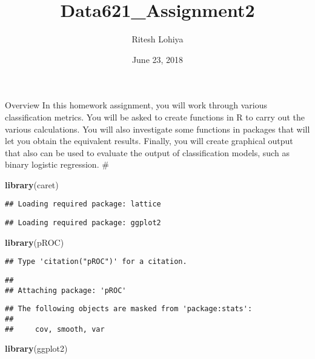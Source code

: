 \documentclass[]{article}
\title{Data621\_Assignment2}
\author{Ritesh Lohiya}
\date{June 23, 2018}
\newenvironment{Shaded}{\begin{snugshade}}{\end{snugshade}}
\newcommand{\KeywordTok}[1]{\textcolor[rgb]{0.13,0.29,0.53}{\textbf{#1}}}
\newcommand{\NormalTok}[1]{#1}
\begin{document}
\maketitle

Overview In this homework assignment, you will work through various
classification metrics. You will be asked to create functions in R to
carry out the various calculations. You will also investigate some
functions in packages that will let you obtain the equivalent results.
Finally, you will create graphical output that also can be used to
evaluate the output of classification models, such as binary logistic
regression. \#

\begin{Shaded}
\begin{Highlighting}[]
\KeywordTok{library}\NormalTok{(caret)}
\end{Highlighting}
\end{Shaded}

\begin{verbatim}
## Loading required package: lattice
\end{verbatim}

\begin{verbatim}
## Loading required package: ggplot2
\end{verbatim}

\begin{Shaded}
\begin{Highlighting}[]
\KeywordTok{library}\NormalTok{(pROC)}
\end{Highlighting}
\end{Shaded}

\begin{verbatim}
## Type 'citation("pROC")' for a citation.
\end{verbatim}

\begin{verbatim}
## 
## Attaching package: 'pROC'
\end{verbatim}

\begin{verbatim}
## The following objects are masked from 'package:stats':
## 
##     cov, smooth, var
\end{verbatim}

\begin{Shaded}
\begin{Highlighting}[]
\KeywordTok{library}\NormalTok{(ggplot2)}
\end{Highlighting}
\end{Shaded}
\end{document}
